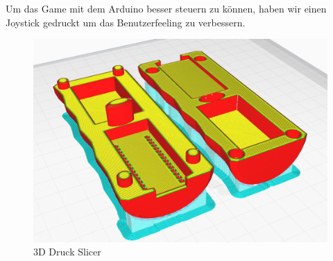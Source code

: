 Um das Game mit dem Arduino besser steuern zu können, haben wir einen Joystick gedruckt um das Benutzerfeeling zu verbessern.

\begin{figure}[H]
    \begin{center}
      \includegraphics[width=0.7\linewidth]{content/images/Joystick_3D-Print_Slicer.jpg}
      \caption{3D Druck Slicer}
    \end{center}
  \end{figure}

